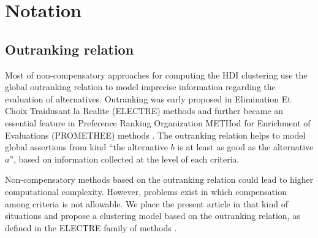 \documentclass[]{elsarticle}
\theoremstyle{definition}
\begin{document}
%
%
%



\section{Notation}\label{notation}

\subsection{Outranking relation}\label{classification}

Most of non-compensatory approaches for computing the HDI clustering use the global outranking relation to model imprecise information regarding the evaluation of alternatives. Outranking was early proposed in Elimination Et Choix Traidusant la Realite (ELECTRE) methods \citep{figueira2010} and further became an essential feature in  Preference Ranking Organization METHod for Enrichment of Evaluations (PROMETHEE) methods \cite{brans85}. The outranking relation helps to model global  assertions from kind ``the alternative $b$ is at least as good as the alternative $a$'', based on information collected at the level of each criteria. 

Non-compensatory methods based on the outranking relation could lead to higher computational complexity. However, problems exist in which compensation among criteria is not allowable. We place the present article in that kind of situations and propose a clustering model based on the outranking relation, as defined in the ELECTRE family of methods \citep{figueira2010}.
\end{document}
